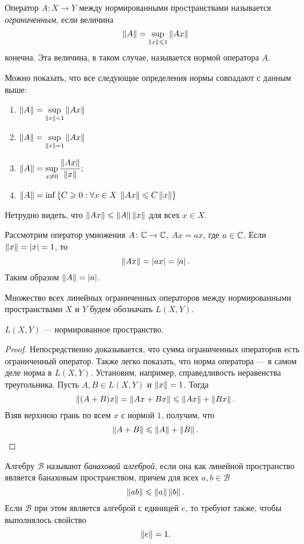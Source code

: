 \begin{definition}
    Оператор $A \colon X \to Y$ между нормированными пространствами 
    называется \emph{ограниченным}, если величина
    \[ \left\|A\right\| = \sup_{\left\|x\right\| \leqslant 1} \left\|Ax\right\| \]
    конечна. Эта величина, в таком случае, называется нормой оператора $A$.
\end{definition}

Можно показать, что все следующие определения нормы совпадают с данным выше:
\begin{enumerate}
    \item $ \left\|A\right\| = \sup\limits_{\left\|x\right\| < 1} \left\|Ax\right\| $
    \item $ \left\|A\right\| = \sup\limits_{\left\|x\right\| = 1} \left\|Ax\right\| $
    \item $ \left\|A\right\| = \sup\limits_{x\neq 0}\displaystyle\frac{\left\|Ax\right\|}{\left\|x\right\|}; $
    \item $ \left\|A\right\| = \inf\left\{C \geqslant 0 : \forall x \in X \; \left\|Ax\right\| \leqslant C
        \left\|x\right\|\right\} $
\end{enumerate}

Нетрудно видеть, что $\left\|Ax\right\| \leqslant \left\|A\right\|\left\|x\right\|$ для всех $x \in X$.

\begin{example}
    Рассмотрим оператор умножения $A \colon \mathbb{C} \to \mathbb{C}$, $Ax = ax$,
    где $a \in \mathbb{C}$. Если $\left\|x\right\| = \left|x\right| = 1$, то 
    \[ \left\|Ax\right\| = \left|ax\right| = \left|a\right|. \]
    Таким образом $\left\|A\right\| = \left|a\right|$.
\end{example}

Множество всех линейных ограниченных операторов между нормированными
пространствами $X$ и $Y$ будем обозначать $L(X, Y)$.

\begin{theorem}
    $L(X, Y)$ --- нормированное пространство.
\end{theorem}

\begin{proof}
    Непосредственно доказывается, что сумма ограниченных
    операторов есть ограниченный оператор. Также легко показать, что норма
    оператора --- в самом деле норма в $L(X, Y)$. Установим, например,
    справедливость неравенства треугольника. Пусть $A, B \in L(X, Y)$ и
    $\left\|x\right\| = 1$. Тогда
    \[ \left\|(A+B)x\right\| = \left\|Ax+Bx\right\| \leqslant \left\|Ax\right\| + \left\|Bx\right\|. \]
    Взяв верхнюю грань по всем $x$ с нормой $1$, получим, что 
    \[ \left\|A + B\right\| \leqslant \left\|A\right\| + \left\|B\right\|. \]
\end{proof}

\begin{definition}
    Алгебру $\mathcal B$ называют \emph{банаховой алгеброй}, если она как линейной пространство
    является банаховым пространством, причем для всех $a, b \in \mathcal B$
    \[ \left\|ab\right\| \leqslant \left\|a\right\|\left\|b\right\|. \]
    Если $\mathcal B$ при этом является алгеброй с единицей $e$, то требуют также, 
    чтобы выполнялось свойство
    \[ \left\|e\right\| = 1. \]
\end{definition}

